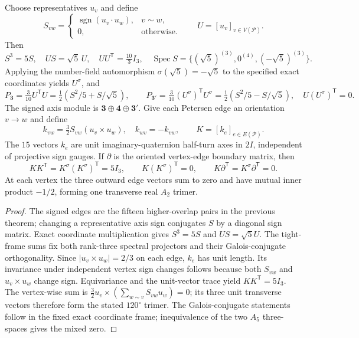 \documentclass[11pt]{article}
\begin{document}
\begin{theorem}
\label{p1:thm:petersen-signed-and-flux}
Choose representatives $u_v$ and define
\[
 S_{vw}=\begin{cases}\operatorname{sgn}(u_v\cdot u_w),&v\sim w,\\0,&\text{otherwise.}\end{cases}
 \qquad U=[u_v]_{v\in V(\mathcal P)}.
\]
Then
\[
 S^3=5S,\quad US=\sqrt5\,U,\quad UU^{\mathsf T}=\tfrac{10}3I_3,
 \quad\operatorname{Spec}S=\{(\sqrt5)^{(3)},0^{(4)},(-\sqrt5)^{(3)}\}.
\]
Applying the number-field automorphism $\sigma(\sqrt5)=-\sqrt5$ to the
specified exact coordinates yields $U^\sigma$, and
\[
 P_{\mathbf3}=\tfrac3{10}U^{\mathsf T}U
     =\tfrac12(S^2/5+S/\sqrt5),\qquad
 P_{\mathbf3'}=\tfrac3{10}(U^\sigma)^{\mathsf T}U^\sigma
     =\tfrac12(S^2/5-S/\sqrt5),
 \quad U(U^\sigma)^{\mathsf T}=0.
\]
The signed axis module is $\mathbf3\oplus\mathbf4\oplus\mathbf3'$.
Give each Petersen edge an orientation $v\to w$ and define
\[
 k_{vw}=\tfrac32 S_{vw}(u_v\times u_w),\quad
 k_{wv}=-k_{vw},\qquad K=[k_e]_{e\in E(\mathcal P)}.
\]
The $15$ vectors $k_e$ are unit imaginary-quaternion half-turn axes
in $2I$, independent of projective sign gauges. If $\partial$ is the
oriented vertex-edge boundary matrix, then
\[
 KK^{\mathsf T}=K^\sigma(K^\sigma)^{\mathsf T}=5I_3,\qquad
 K(K^\sigma)^{\mathsf T}=0,\qquad
 K\partial^{\mathsf T}=K^\sigma\partial^{\mathsf T}=0.
\]
At each vertex the three outward edge vectors sum to zero and have
mutual inner product $-1/2$, forming one transverse real $A_2$ trimer.
\end{theorem}
\begin{proof}
The signed edges are the fifteen higher-overlap pairs in the previous
theorem; changing a representative axis sign conjugates $S$ by a
diagonal sign matrix. Exact coordinate multiplication gives $S^3=5S$
and $US=\sqrt5U$. The tight-frame sums fix both rank-three spectral
projectors and their Galois-conjugate orthogonality. Since
$|u_v\times u_w|=2/3$ on each edge, $k_e$ has unit length. Its
invariance under independent vertex sign changes follows because
both $S_{vw}$ and $u_v\times u_w$ change sign. Equivariance and the
unit-vector trace yield $KK^{\mathsf T}=5I_3$. The vertex-wise sum is
$\tfrac32u_v\times(\sum_{w\sim v}S_{vw}u_w)=0$; its three unit
transverse vectors therefore form the stated $120^\circ$ trimer.
The Galois-conjugate statements follow in the fixed exact coordinate
frame; inequivalence of the two $A_5$ three-spaces gives the mixed zero.
\end{proof}
\end{document}
